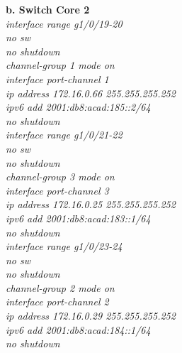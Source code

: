 \documentclass[12pt,a4paper]{report}
\begin{document}
\hspace*{1cm}\textbf{b. Switch Core 2}\\
\hspace*{2cm}\textit{interface range g1/0/19-20\\
\hspace*{2cm}no sw\\
\hspace*{2cm}no shutdown\\
\hspace*{2cm}channel-group 1 mode on \\
\hspace*{2cm}interface port-channel 1\\
\hspace*{2cm}ip address 172.16.0.66 255.255.255.252\\
\hspace*{2cm}ipv6 add 2001:db8:acad:185::2/64\\
\hspace*{2cm}no shutdown\\
\hspace*{2cm}interface range g1/0/21-22\\
\hspace*{2cm}no sw\\
\hspace*{2cm}no shutdown\\
\hspace*{2cm}channel-group 3 mode on \\
\hspace*{2cm}interface port-channel 3\\
\hspace*{2cm}ip address 172.16.0.25 255.255.255.252\\
\hspace*{2cm}ipv6 add 2001:db8:acad:183::1/64\\
\hspace*{2cm}no shutdown\\
\hspace*{2cm}interface range g1/0/23-24\\
\hspace*{2cm}no sw\\
\hspace*{2cm}no shutdown\\
\hspace*{2cm}channel-group 2 mode on \\
\hspace*{2cm}interface port-channel 2\\
\hspace*{2cm}ip address 172.16.0.29 255.255.255.252\\
\hspace*{2cm}ipv6 add 2001:db8:acad:184::1/64\\
\hspace*{2cm}no shutdown\\}
\end{document}
